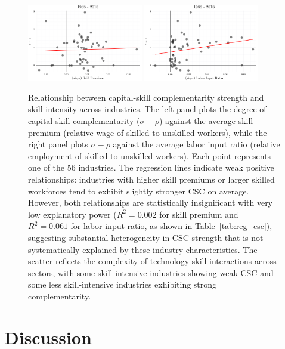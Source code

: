 \documentclass[12pt]{article}
\begin{document}
\begin{figure}[H]
 \centering
 \includegraphics[width=0.45\textwidth]{../images/corr_sp_sigma_rho.png}
 \hfill
 \includegraphics[width=0.45\textwidth]{../images/corr_li_sigma_rho.png}
 \caption{\label{fig:trends_correlation_csc} Relationship between capital-skill complementarity strength and skill intensity across industries. The left panel plots the degree of capital-skill complementarity ($\sigma - \rho$) against the average skill premium (relative wage of skilled to unskilled workers), while the right panel plots $\sigma - \rho$ against the average labor input ratio (relative employment of skilled to unskilled workers). Each point represents one of the 56 industries. The regression lines indicate weak positive relationships: industries with higher skill premiums or larger skilled workforces tend to exhibit slightly stronger CSC on average. However, both relationships are statistically insignificant with very low explanatory power ($R^2 = 0.002$ for skill premium and $R^2 = 0.061$ for labor input ratio, as shown in Table~\ref{tab:reg_csc}), suggesting substantial heterogeneity in CSC strength that is not systematically explained by these industry characteristics. The scatter reflects the complexity of technology-skill interactions across sectors, with some skill-intensive industries showing weak CSC and some less skill-intensive industries exhibiting strong complementarity.}
\end{figure}

\section{Discussion}\label{sec:discussion}
\end{document}
